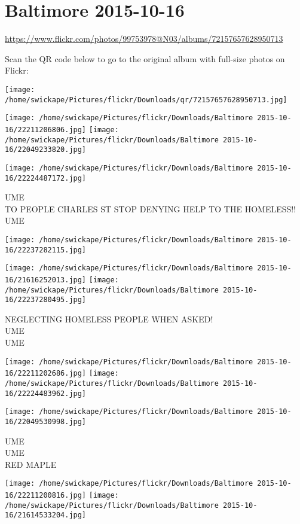 \documentclass[10pt,letterpaper]{article}
\title{}
\author{}
\date{}
\begin{document}
\section*{Baltimore 2015-10-16}

\url{https://www.flickr.com/photos/99753978@N03/albums/72157657628950713}

Scan the QR code below to go to the original album with full-size photos on Flickr:

\texttt{[image: /home/swickape/Pictures/flickr/Downloads/qr/72157657628950713.jpg]}
\pagebreak

\texttt{[image: /home/swickape/Pictures/flickr/Downloads/Baltimore 2015-10-16/22211206806.jpg]}
\texttt{[image: /home/swickape/Pictures/flickr/Downloads/Baltimore 2015-10-16/22049233820.jpg]}

\texttt{[image: /home/swickape/Pictures/flickr/Downloads/Baltimore 2015-10-16/22224487172.jpg]}

UME\\
TO PEOPLE CHARLES ST STOP DENYING HELP TO THE HOMELESS!!\\
UME
\pagebreak

\texttt{[image: /home/swickape/Pictures/flickr/Downloads/Baltimore 2015-10-16/22237282115.jpg]}

\vspace{0.25in}
\texttt{[image: /home/swickape/Pictures/flickr/Downloads/Baltimore 2015-10-16/21616252013.jpg]}
\texttt{[image: /home/swickape/Pictures/flickr/Downloads/Baltimore 2015-10-16/22237280495.jpg]}

NEGLECTING HOMELESS PEOPLE WHEN ASKED!\\
UME\\
UME
\pagebreak

\texttt{[image: /home/swickape/Pictures/flickr/Downloads/Baltimore 2015-10-16/22211202686.jpg]}
\texttt{[image: /home/swickape/Pictures/flickr/Downloads/Baltimore 2015-10-16/22224483962.jpg]}

\vspace{0.25in}
\texttt{[image: /home/swickape/Pictures/flickr/Downloads/Baltimore 2015-10-16/22049530998.jpg]}

UME\\
UME\\
RED MAPLE
\pagebreak

\texttt{[image: /home/swickape/Pictures/flickr/Downloads/Baltimore 2015-10-16/22211200816.jpg]}
\texttt{[image: /home/swickape/Pictures/flickr/Downloads/Baltimore 2015-10-16/21614533204.jpg]}
\end{document}
